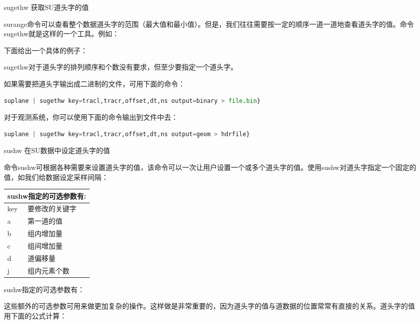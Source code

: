 \begin{enumerate}
	\item[sugethw] 获取SU道头字的值\par
	surange命令可以查看整个数据道头字的范围（最大值和最小值）。但是，我们往往需要按一定的顺序一道一道地查看道头字的值。命令sugethw就是这样的一个工具。例如：\par
	\par
	下面给出一个具体的例子：\par
	\par
	sugethw对于道头字的排列顺序和个数没有要求，但至少要指定一个道头字。\par
	如果需要把道头字输出成二进制的文件，可用下面的命令：
\begin{lstlisting}[language=python]
suplane | sugethw key=tracl,tracr,offset,dt,ns output=binary > file.bin}
\end{lstlisting}
	对于观测系统，你可以使用下面的命令输出到文件中去：
\begin{lstlisting}[language=python]
suplane | sugethw key=tracl,tracr,offset,dt,ns output=geom > hdrfile}
\end{lstlisting}
	\item[sushw] 在SU数据中设定道头字的值\label{key:sushw}\par
	命令sushw可根据各种需要来设置道头字的值，该命令可以一次让用户设置一个或多个道头字的值。使用sushw对道头字指定一个固定的值，如我们给数据设定采样间隔：\par
	\par\vspace{0.5em}
	\begin{tabular}{ll}
		\toprule
		\multicolumn{2}{l}{sushw指定的可选参数有:}\\
		\midrule
			key & 要修改的关键字\\	
			a & 第一道的值\\		
			b & 组内增加量\\			
			c & 组间增加量\\			
			d & 道偏移量\\			
			j & 组内元素个数\\
		\bottomrule
	\end{tabular}\par\vspace{0.5em}
	sushw指定的可选参数有：\par
	这些额外的可选参数可用来做更加复杂的操作。这样做是非常重要的，因为道头字的值与道数据的位置常常有直接的关系。道头字的值用下面的公式计算：

\end{enumerate}

